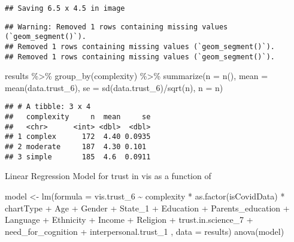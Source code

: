 \documentclass[
]{article}
\newenvironment{Shaded}{\begin{snugshade}}{\end{snugshade}}
\newcommand{\AttributeTok}[1]{\textcolor[rgb]{0.77,0.63,0.00}{#1}}
\newcommand{\FunctionTok}[1]{\textcolor[rgb]{0.00,0.00,0.00}{#1}}
\newcommand{\NormalTok}[1]{#1}
\newcommand{\OtherTok}[1]{\textcolor[rgb]{0.56,0.35,0.01}{#1}}
\newcommand{\SpecialCharTok}[1]{\textcolor[rgb]{0.00,0.00,0.00}{#1}}
\begin{document}
\begin{verbatim}
## Saving 6.5 x 4.5 in image
\end{verbatim}

\begin{verbatim}
## Warning: Removed 1 rows containing missing values (`geom_segment()`).
## Removed 1 rows containing missing values (`geom_segment()`).
## Removed 1 rows containing missing values (`geom_segment()`).
\end{verbatim}

\begin{Shaded}
\begin{Highlighting}[]
\NormalTok{results }\SpecialCharTok{\%\textgreater{}\%}
  \FunctionTok{group\_by}\NormalTok{(complexity) }\SpecialCharTok{\%\textgreater{}\%}
  \FunctionTok{summarize}\NormalTok{(}\AttributeTok{n =} \FunctionTok{n}\NormalTok{(),}
            \AttributeTok{mean =} \FunctionTok{mean}\NormalTok{(data.trust\_6),}
            \AttributeTok{se =} \FunctionTok{sd}\NormalTok{(data.trust\_6)}\SpecialCharTok{/}\FunctionTok{sqrt}\NormalTok{(n),}
            \AttributeTok{n =}\NormalTok{ n)}
\end{Highlighting}
\end{Shaded}

\begin{verbatim}
## # A tibble: 3 x 4
##   complexity     n  mean     se
##   <chr>      <int> <dbl>  <dbl>
## 1 complex      172  4.40 0.0935
## 2 moderate     187  4.30 0.101 
## 3 simple       185  4.6  0.0911
\end{verbatim}

Linear Regression Model for trust in vis as a function of

\begin{Shaded}
\begin{Highlighting}[]
\NormalTok{model }\OtherTok{\textless{}{-}} \FunctionTok{lm}\NormalTok{(}\AttributeTok{formula =}\NormalTok{ vis.trust\_6 }\SpecialCharTok{\textasciitilde{}}\NormalTok{ complexity }\SpecialCharTok{*} \FunctionTok{as.factor}\NormalTok{(isCovidData) }\SpecialCharTok{*}\NormalTok{ chartType}
                                    \SpecialCharTok{+}\NormalTok{ Age }\SpecialCharTok{+}\NormalTok{ Gender }\SpecialCharTok{+}\NormalTok{ State\_1 }\SpecialCharTok{+}\NormalTok{ Education }\SpecialCharTok{+}\NormalTok{ Parents\_education }\SpecialCharTok{+}\NormalTok{ Language }\SpecialCharTok{+}\NormalTok{ Ethnicity }\SpecialCharTok{+}\NormalTok{ Income }\SpecialCharTok{+}\NormalTok{ Religion }\SpecialCharTok{+}\NormalTok{ trust.in.science\_7 }\SpecialCharTok{+}\NormalTok{ need\_for\_cognition }\SpecialCharTok{+}\NormalTok{ interpersonal.trust\_1 ,}
            \AttributeTok{data =}\NormalTok{ results)}
\FunctionTok{anova}\NormalTok{(model)}
\end{Highlighting}
\end{Shaded}
\end{document}
